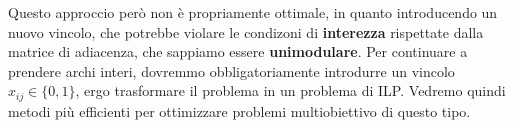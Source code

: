 \documentclass[a4paper,11pt]{article}
\begin{document}
Questo approccio però non è propriamente ottimale, in quanto introducendo un nuovo vincolo, che potrebbe violare le condizoni di \textbf{interezza} rispettate dalla matrice di adiacenza, che sappiamo essere \textbf{unimodulare}.
Per continuare a prendere archi interi, dovremmo obbligatoriamente introdurre un vincolo $x_{ij} \in \{0, 1\}$, ergo trasformare il problema in un problema di ILP.
Vedremo quindi metodi più efficienti per ottimizzare problemi multiobiettivo di questo tipo.
\end{document}
